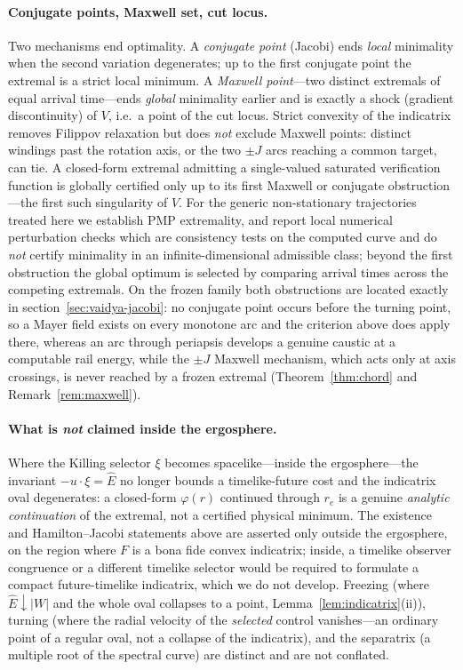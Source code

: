 \documentclass[12pt]{iopart}
\newcommand{\Ehat}{\hat E}
\newcommand{\re}{r_{e}}
\theoremstyle{plain}
\theoremstyle{definition}
\theoremstyle{plain}
\theoremstyle{remark}
\begin{document}
\paragraph{Conjugate points, Maxwell set, cut locus.} Two mechanisms end
optimality. A \emph{conjugate point} (Jacobi) ends \emph{local} minimality when
the second variation degenerates; up to the first conjugate point the extremal is
a strict local minimum. A \emph{Maxwell point}---two distinct extremals of equal
arrival time---ends \emph{global} minimality earlier and is exactly a shock
(gradient discontinuity) of $V$, i.e.\ a point of the cut locus. Strict convexity
of the indicatrix removes Filippov relaxation but does \emph{not} exclude Maxwell
points: distinct windings past the rotation axis, or the two $\pm J$ arcs reaching
a common target, can tie. A closed-form extremal admitting a single-valued saturated
verification function is globally certified only up to its first Maxwell or conjugate
obstruction---the first such singularity of $V$. For the generic non-stationary
trajectories treated here we establish PMP extremality, and report local numerical
perturbation checks which are consistency tests on the computed curve and do
\emph{not} certify minimality in an infinite-dimensional admissible class; beyond the first
obstruction the global optimum is selected by comparing arrival times across the competing
extremals. On the frozen family both obstructions are located exactly in
section~\ref{sec:vaidya-jacobi}: no conjugate point occurs before the turning point, so a
Mayer field exists on every monotone arc and the criterion above does apply there, whereas
an arc through periapsis develops a genuine caustic at a computable rail energy, while
the $\pm J$ Maxwell mechanism, which acts only at axis crossings, is never reached by a
frozen extremal (Theorem~\ref{thm:chord} and Remark~\ref{rem:maxwell}).

\paragraph{What is \emph{not} claimed inside the ergosphere.} Where the Killing
selector $\xi$ becomes spacelike---inside the ergosphere---the invariant
$-u\cdot\xi=\Ehat$ no longer bounds a timelike-future cost and the indicatrix oval
degenerates: a closed-form $\varphi(r)$ continued through $\re$ is a genuine
\emph{analytic continuation} of the
extremal, not a certified physical minimum. The existence and Hamilton--Jacobi
statements above are asserted only outside the ergosphere, on the region where $F$
is a bona fide convex indicatrix; inside, a timelike observer congruence or a different
timelike selector would be required to formulate a compact future-timelike indicatrix,
which we do not develop. Freezing (where $\Ehat\downarrow|W|$ and the whole oval collapses to a
point, Lemma~\ref{lem:indicatrix}(ii)), turning (where
the radial velocity of the \emph{selected} control vanishes---an ordinary point of a regular
oval, not a collapse of the indicatrix), and the separatrix (a multiple root of the
spectral curve) are distinct and are not conflated.
\end{document}
